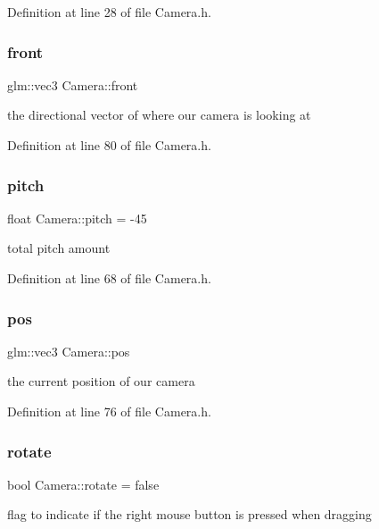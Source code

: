 Definition at line 28 of file Camera.\+h.

\mbox{\label{struct_camera_a8847cf29c9c124906ad5d97ecb5c55d1}} 
\subsubsection{front}
{\footnotesize\ttfamily glm\+::vec3 Camera\+::front}



the directional vector of where our camera is looking at 



Definition at line 80 of file Camera.\+h.

\mbox{\label{struct_camera_ab56fcb39f580e8d2159cf2c9c6d9a65a}} 
\subsubsection{pitch}
{\footnotesize\ttfamily float Camera\+::pitch = -\/45}



total pitch amount 



Definition at line 68 of file Camera.\+h.

\mbox{\label{struct_camera_ae54915cea5c8741a9cc38b8f9b6849ff}} 
\subsubsection{pos}
{\footnotesize\ttfamily glm\+::vec3 Camera\+::pos}



the current position of our camera 



Definition at line 76 of file Camera.\+h.

\mbox{\label{struct_camera_a3c93358666e338932c06434f8127e31d}} 
\subsubsection{rotate}
{\footnotesize\ttfamily bool Camera\+::rotate = false}



flag to indicate if the right mouse button is pressed when dragging 



